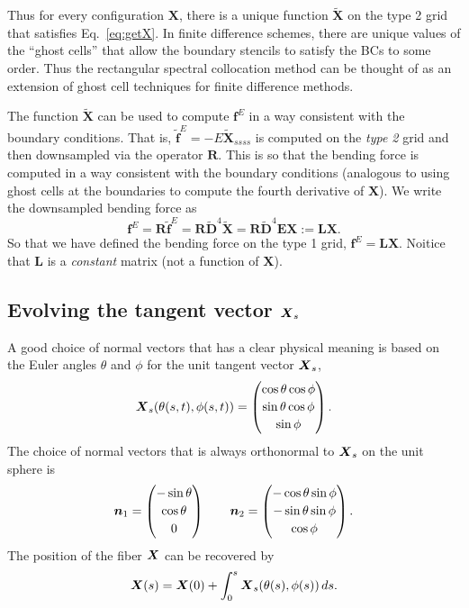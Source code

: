 Thus for every configuration $\bm{X}$, there is a unique function $\tilde{\bm{X}}$ on the type 2 grid that satisfies Eq.\ \eqref{eq:getX}.  In finite difference schemes, there are unique values of the ``ghost cells'' that allow the boundary stencils to satisfy the BCs to some order. Thus the rectangular spectral collocation method can be thought of as an extension of ghost cell techniques for finite difference methods.  

The function $\tilde{\bm{X}}$ can be used to compute $\bm{f}^E$ in a way consistent with the boundary conditions. That is, $\tilde{\bm{f}}^E=-E\tilde{\bm{X}}_{ssss}$ is computed on the \textit{type 2} grid and then downsampled via the operator $\bm{R}$. This is so that the bending force is computed in a way consistent with the boundary conditions (analogous to using ghost cells at the boundaries to compute the fourth derivative of $\bm{X}$). We write the downsampled bending force as
\begin{equation}
\label{eq:fE}
\bm{f}^E=\bm{R}\tilde{\bm{f}}^E=\bm{R}\tilde{\bm{D}}^4 \tilde{\bm{X}} = \bm{R}\tilde{\bm{D}}^4 \bm{E}\bm{X}:=\bm{L}\bm{X}.
\end{equation}
So that we have defined the bending force on the type 1 grid, $\bm{f}^E=\bm{L}\bm{X}$. Noitice that $\bm{L}$ is a \textit{constant} matrix (not a function of $\bm{X}$). 

\subsection{Evolving the tangent vector $\boldsymbol{X}_s$}

A good choice of normal vectors that has a clear physical meaning is based on the Euler angles $\theta$ and $\phi$ for the unit tangent vector $\boldsymbol{X}_s$,
\begin{equation}
\boldsymbol{X}_s(\theta(s,t),\phi(s,t)) = \begin{pmatrix} \cos{\theta} \cos{\phi}\\[2 pt] \sin{\theta} \cos{\phi} \\[2 pt] \sin{\phi} \end{pmatrix}.
\end{equation}
The choice of normal vectors that is always orthonormal to $\boldsymbol{X}_s$ on the unit sphere is
\begin{equation}
\label{eq:nangles}
\boldsymbol{n}_1 =  \begin{pmatrix} -\sin{\theta}\\[2 pt] \cos{\theta}\\[2 pt]0 \end{pmatrix} \qquad \boldsymbol{n}_2 =  \begin{pmatrix} -\cos{\theta} \sin{\phi}\\[2 pt] -\sin{\theta} \sin{\phi} \\[2 pt] \cos{\phi} \end{pmatrix}. 
\end{equation}
The position of the fiber $\boldsymbol{X}$ can be recovered by 
\begin{equation}
\label{eq:XfromXs}
\boldsymbol{X}(s)= \boldsymbol{X}(0)+\int_0^s \boldsymbol{X}_s(\theta(s),\phi(s)) \, ds. 
\end{equation}

